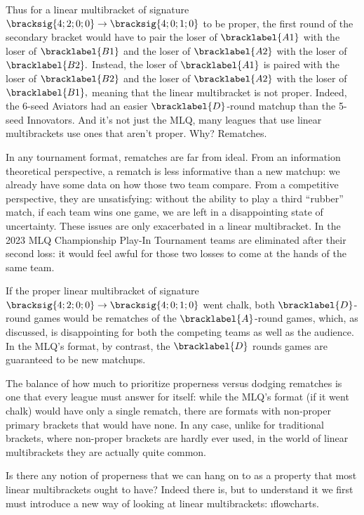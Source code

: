 {    Thus for a linear multibracket of signature $\bracksig{4;2;0;0} \to \bracksig{4;0;1;0}$ to be proper, the first round of the secondary bracket would have to pair the loser of $\bracklabel{A1}$ with the loser of $\bracklabel{B1}$ and the loser of $\bracklabel{A2}$ with the loser of $\bracklabel{B2}.$ Instead, the loser of $\bracklabel{A1}$ is paired with the loser of $\bracklabel{B2}$ and the loser of $\bracklabel{A2}$ with the loser of $\bracklabel{B1},$ meaning that the linear multibracket is not proper. Indeed, the 6-seed Aviators had an easier $\bracklabel{D}$-round matchup than the 5-seed Innovators. And it's not just the MLQ, many leagues that use linear multibrackets use ones that aren't proper. Why? Rematches.

    In any tournament format, rematches are far from ideal. From an information theoretical perspective, a rematch is less informative than a new matchup: we already have some data on how those two team compare. From a competitive perspective, they are unsatisfying: without the ability to play a third ``rubber'' match, if each team wins one game, we are left in a disappointing state of uncertainty. These issues are only exacerbated in a linear multibracket. In the 2023 MLQ Championship Play-In Tournament teams are eliminated after their second loss: it would feel awful for those two losses to come at the hands of the same team.

    If the proper linear multibracket of signature $\bracksig{4;2;0;0} \to \bracksig{4;0;1;0}$ went chalk, both $\bracklabel{D}$-round games would be rematches of the $\bracklabel{A}$-round games, which, as discussed, is disappointing for both the competing teams as well as the audience. In the MLQ's format, by contrast, the $\bracklabel{D}$ rounds games are guaranteed to be new matchups.

    The balance of how much to prioritize properness versus dodging rematches is one that every league must answer for itself: while the MLQ's format (if it went chalk) would have only a single rematch, there are formats with non-proper primary brackets that would have none. In any case, unlike for traditional brackets, where non-proper brackets are hardly ever used, in the world of linear multibrackets they are actually quite common.

    Is there any notion of properness that we can hang on to as a property that most linear multibrackets ought to have? Indeed there is, but to understand it we first must introduce a new way of looking at linear multibrackets: \i{flowcharts}.

}
